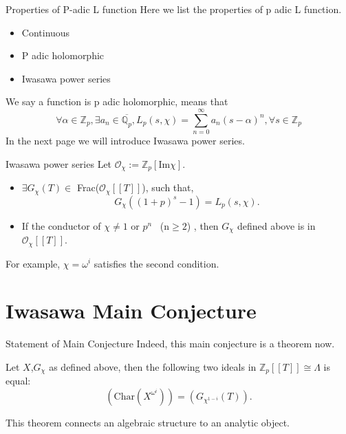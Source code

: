 \documentclass{beamer}
\theoremstyle{plain}
\theoremstyle{definition}
\theoremstyle{remark}
\newcommand{\Q}{\mathbb{Q}}
\newcommand{\Z}{\mathbb{Z}}
\newcommand{\mo}{\mathcal{O}}
\begin{document}
\begin{frame}{Properties of P-adic L function}
  Here we list the properties of p adic L function.
  \begin{itemize}
    \item Continuous
    \item P adic holomorphic
    \item Iwasawa power series
  \end{itemize}
  We say a function is p adic holomorphic, means that 
  \[ \forall \alpha \in \Z_p, \exists a_n \in \overline{ \Q_p}, L_p(s,\chi)=
  \sum_{n=0}^{\infty} a_n(s-\alpha )^n, \forall s \in \Z_p\]
  In the next page we will introduce Iwasawa power series.
  
\end{frame}

\begin{frame}{Iwasawa power series}
  Let $ \mo_{\chi}:=\Z_p[\text{Im} \chi]$.
  \begin{theorem}
    \begin{itemize}
      \item $\exists G_{\chi}(T) \in  $ Frac($\mo_{\chi}[[T]]$), such that,
       \[G_{\chi}((1+p)^s-1)=L_p(s,\chi).\]
      \item If the conductor of $\chi \neq 1 $ or $p^n$ \ (n$ \geq 2$) , then 
      $G_{\chi}$ defined above is in  $\mo_{\chi}[[T]]$. 
    \end{itemize}
  \end{theorem}
  For example, $\chi =\omega^i$ satisfies the second condition.
\end{frame}

\section{Iwasawa Main Conjecture}
\begin{frame}{Statement of Main Conjecture}
  Indeed, this main conjecture is a theorem now.
  \begin{theorem}
    Let $X$,$G_{\chi}$ as defined above, then the following two ideals in $\Z_p[[T]] \cong \Lambda$ is equal:
    \[ ( \text{Char}(X^{\omega^i}) ) =( G_{\chi^{1-i}}(T)) .
      \]
  \end{theorem}
  This theorem connects an algebraic structure to an analytic object.
\end{frame}
\end{document}
